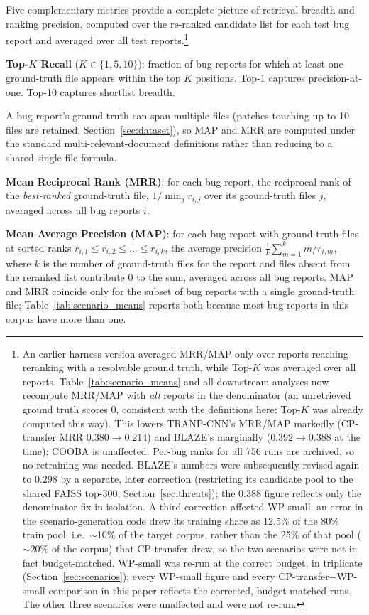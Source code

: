 \documentclass[a4paper,fleqn]{cas-dc}
\begin{document}
Five complementary metrics provide a complete picture of retrieval breadth and
ranking precision, computed over the re-ranked candidate list for each test bug
report and averaged over all test reports.\footnote{An earlier harness
version averaged MRR/MAP only over reports reaching reranking with a
resolvable ground truth, while Top-$K$ was averaged over all reports.
Table~\ref{tab:scenario_means} and all downstream analyses now recompute
MRR/MAP with \emph{all} reports in the denominator (an unretrieved ground
truth scores $0$, consistent with the definitions here; Top-$K$ was already
computed this way). This lowers TRANP-CNN's MRR/MAP markedly (CP-transfer
MRR $0.380 \rightarrow 0.214$) and BLAZE's marginally ($0.392 \rightarrow
0.388$ at the time); COOBA is unaffected. Per-bug ranks for all 756 runs are
archived, so no retraining was needed. BLAZE's numbers were subsequently
revised again to $0.298$ by a separate, later correction (restricting its
candidate pool to the shared FAISS top-300, Section~\ref{sec:threats}); the
$0.388$ figure reflects only the denominator fix in isolation. A third
correction affected WP-small: an error in the scenario-generation code drew
its training share as 12.5\% of the 80\% train pool, i.e.\ $\sim$10\% of the
target corpus, rather than the 25\% of that pool ($\sim$20\% of the corpus)
that CP-transfer drew, so the two scenarios were not in fact budget-matched.
WP-small was re-run at the correct budget, in triplicate
(Section~\ref{sec:scenarios}); every WP-small figure and every
CP-transfer$-$WP-small comparison in this paper reflects the corrected,
budget-matched runs. The other three scenarios were unaffected and were not
re-run.}

\textbf{Top-$K$ Recall} ($K \in \{1, 5, 10\}$): fraction of bug reports for which
at least one ground-truth file appears within the top $K$ positions. Top-1 captures
precision-at-one. Top-10 captures shortlist breadth.

A bug report's ground truth can span multiple files (patches touching up to 10
files are retained, Section~\ref{sec:dataset}), so MAP and MRR are computed under
the standard multi-relevant-document definitions rather than reducing to a shared
single-file formula.

\textbf{Mean Reciprocal Rank (MRR)}: for each bug report, the reciprocal rank of
the \emph{best-ranked} ground-truth file, $1/\min_j r_{i,j}$ over its ground-truth
files $j$, averaged across all bug reports $i$.

\textbf{Mean Average Precision (MAP)}: for each bug report with ground-truth files
at sorted ranks $r_{i,1} \le r_{i,2} \le \dots \le r_{i,k}$, the average precision
$\frac{1}{k}\sum_{m=1}^{k} m / r_{i,m}$, where $k$ is the number of ground-truth
files for the report and files absent from the reranked list contribute $0$ to
the sum, averaged across all bug reports. MAP and
MRR coincide only for the subset of bug reports with a single ground-truth file;
Table~\ref{tab:scenario_means} reports both because most bug reports in this
corpus have more than one.
\end{document}

